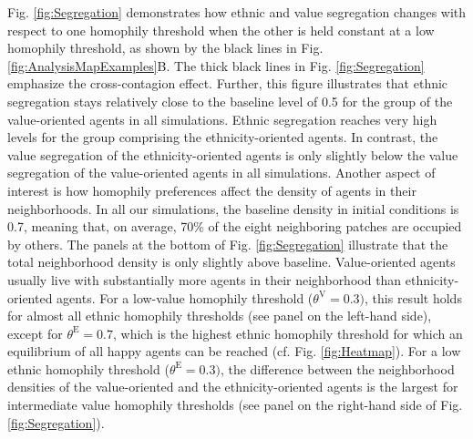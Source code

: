 \documentclass{ws-acs}
\begin{document}
{Fig. \ref{fig:Segregation} demonstrates how ethnic and value segregation changes with respect to one homophily threshold when the other is held constant at a low homophily threshold, as shown by the black lines in Fig. \ref{fig:AnalysisMapExamples}B. The thick black lines in Fig. \ref{fig:Segregation} emphasize the cross-contagion effect. Further, this figure illustrates that ethnic segregation stays relatively close to the baseline level of 0.5 for the group of the value-oriented agents in all simulations. Ethnic segregation reaches very high levels for the group comprising the ethnicity-oriented agents. In contrast, the value segregation of the ethnicity-oriented agents is only slightly below the value segregation of the value-oriented agents in all simulations. Another aspect of interest is how homophily preferences affect the density of agents in their neighborhoods. In all our simulations, the baseline density in initial conditions is 0.7, meaning that, on average, 70\% of the eight neighboring patches are occupied by others. The panels at the bottom of Fig. \ref{fig:Segregation} illustrate that the total neighborhood density is only slightly above baseline. Value-oriented agents usually live with substantially more agents in their neighborhood than ethnicity-oriented agents. For a low-value homophily threshold ($\theta^\text{V}=0.3)$, this result holds for almost all ethnic homophily thresholds (see panel on the left-hand side), except for $\theta^\text{E}=0.7$, which is the highest ethnic homophily threshold for which an equilibrium of all happy agents can be reached (cf. Fig. \ref{fig:Heatmap}). For a low ethnic homophily threshold ($\theta^\text{E}=0.3)$, the difference between the neighborhood densities of the value-oriented and the ethnicity-oriented agents is the largest for intermediate value homophily thresholds (see panel on the right-hand side of Fig. \ref{fig:Segregation}).

}
\end{document}
